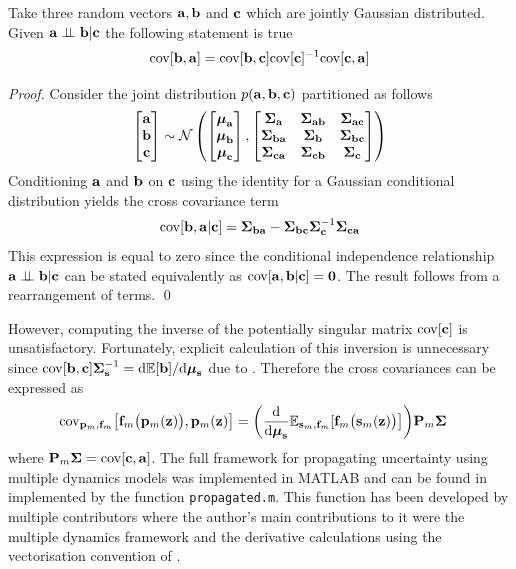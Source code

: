 \begin{theo} \label{theo:condind}
Take three random vectors $\ba,\bb$ and $\bc$ which are jointly Gaussian distributed. Given $\ba \ci \bb | \bc$ the following statement is true
\begin{equation*}
\cov[\bb,\ba] = \cov[\bb,\bc] \cov[\bc]^{-1} \cov[\bc,\ba]
\end{equation*}
\end{theo}

\begin{proof}
Consider the joint distribution $p(\ba,\bb,\bc)$ partitioned as follows
\begin{equation*}
\bmat{\ba \\ \bb \\ \bc} \sim \cN \left(
\bmat{\bm_{\ba} \\ \bm_{\bb} \\ \bm_{\bc}},
\bmat{
\bS_{\ba} & \bS_{\ba\bb} & \bS_{\ba\bc} \\
\bS_{\bb\ba} & \bS_{\bb} & \bS_{\bb\bc} \\
\bS_{\bc\ba} & \bS_{\bc\bb} & \bS_{\bc}
} \right)
\end{equation*}
Conditioning $\ba$ and $\bb$ on $\bc$ using the identity for a Gaussian conditional distribution yields the cross covariance term
\begin{equation*}
\cov[\bb,\ba|\bc] = \bS_{\bb\ba} - \bS_{\bb\bc} \bS_{\bc}^{-1} \bS_{\bc\ba}
\end{equation*}
This expression is equal to zero since the conditional independence relationship $\ba \ci \bb | \bc$ can be stated equivalently as $\cov[\ba,\bb|\bc] = \bO$. The result follows from a rearrangement of terms.
\qed
\end{proof}

However, computing the inverse of the potentially singular matrix $\cov[\bc]$ is unsatisfactory. Fortunately, explicit calculation of this inversion is unnecessary since $\cov[\bb,\bc] \bS_{\bs}^{-1} = \dd\EE[\bb]/\dd\bm_{\bs}$ due to . Therefore the cross covariances can be expressed as
\begin{align*}
\cov_{\bp_m,\bff_m}\big[\bff_m\big(\bp_m(\bz)\big), \bp_m(\bz)\big]
&= \bigg(\diff{}{ \bm_{\bs} } \EE_{\bs_m,\bff_m}[\bff_m\big(\bs_m(\bz)\big)\big] \bigg) \bP_m \bS
\end{align*}
where $\bP_m\bS = \cov[\bc,\ba]$. The full framework for propagating uncertainty using multiple dynamics models was implemented in MATLAB and can be found in  implemented by the function \texttt{propagated.m}. This function has been developed by multiple contributors where the author's main contributions to it were the multiple dynamics framework and the derivative calculations using the vectorisation convention of .

